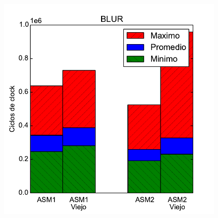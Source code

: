 \begin{figure}[h!]
	\centering
	\includegraphics[scale=0.45]{images/blur_comparationOLD}
\end{figure}



\newpage




